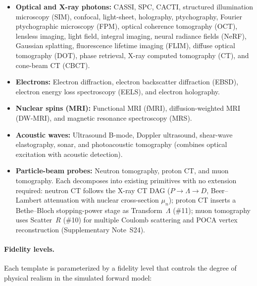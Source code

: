 \documentclass[11pt]{article}
\begin{document}
\begin{itemize}
  \item \textbf{Optical and X-ray photons:}  CASSI, SPC, CACTI, structured
    illumination microscopy (SIM), confocal, light-sheet, holography,
    ptychography, Fourier ptychographic microscopy (FPM), optical coherence
    tomography (OCT), lensless imaging, light field, integral imaging,
    neural radiance fields (NeRF), Gaussian splatting, fluorescence
    lifetime imaging (FLIM), diffuse optical tomography (DOT),
    phase retrieval, X-ray computed tomography (CT), and cone-beam CT
    (CBCT).
  \item \textbf{Electrons:}  Electron diffraction, electron backscatter
    diffraction (EBSD), electron energy loss spectroscopy (EELS), and
    electron holography.
  \item \textbf{Nuclear spins (MRI):}  Functional MRI (fMRI), diffusion-weighted
    MRI (DW-MRI), and magnetic resonance spectroscopy (MRS).
  \item \textbf{Acoustic waves:}  Ultrasound B-mode, Doppler ultrasound,
    shear-wave elastography, sonar, and photoacoustic tomography
    (combines optical excitation with acoustic detection).
  \item \textbf{Particle-beam probes:}  Neutron tomography, proton CT,
    and muon tomography.  Each decomposes into existing primitives with
    no extension required: neutron CT follows the X-ray CT DAG
    ($P \!\to\! \Lambda \!\to\! D$, Beer--Lambert attenuation with nuclear
    cross-section $\mu_n$); proton CT inserts a Bethe--Bloch
    stopping-power stage as Transform~$\Lambda$ (\#11); muon tomography
    uses Scatter~$R$ (\#10) for multiple Coulomb scattering and
    POCA vertex reconstruction (Supplementary Note~S24).
\end{itemize}

\paragraph{Fidelity levels.}
Each template is parameterized by a fidelity level that controls the
degree of physical realism in the simulated forward model:
\end{document}
